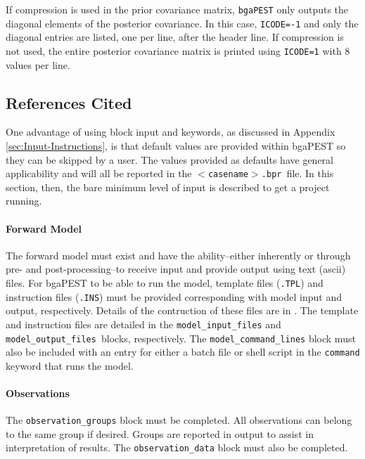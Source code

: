 \documentclass[11pt,oneside,onecolumn]{usgsreport}
\begin{document}
\begin{appendix}
\begin{bibunit}
If compression is used in the prior covariance matrix, \texttt{bgaPEST}
only outputs the diagonal elements of the posterior covariance. In
this case, \texttt{ICODE=-1} and only the diagonal entries are listed,
one per line, after the header line. If compression is not used, the
entire posterior covariance matrix is printed using \texttt{ICODE=1}
with 8 values per line.

\subsection{References Cited}
\putbib[GW]
\end{bibunit}
\begin{bibunit}

One advantage of using block input and keywords, as discussed in Appendix
\ref{sec:Input-Instructions}, is that default values are provided
within bgaPEST so they can be skipped by a user. The values provided
as defaults have general applicability and will all be reported in
the \texttt{$<$casename$>$.bpr }file. In this section, then, the bare
minimum level of input is described to get a project running. 


\paragraph*{Forward Model}

The forward model must exist and have the ability--either inherently
or through pre- and post-processing--to receive input and provide
output using text (ascii) files. For bgaPEST to be able to run the
model, template files (\texttt{.TPL}) and instruction files (\texttt{.INS})
must be provided corresponding with model input and output, respectively.
Details of the contruction of these files are in \citep[chapter 3]{PEST}.
The template and instruction files are detailed in the \texttt{model\_input\_files}
and \texttt{model\_output\_files }blocks, respectively. The \texttt{model\_command\_lines}
block must also be included with an entry for either a batch file
or shell script in the \texttt{command} keyword that runs the model.


\paragraph*{Observations}

The \texttt{observation\_groups} block must be completed. All observations
can belong to the same group if desired. Groups are reported in output
to assist in interpretation of results. The \texttt{observation\_data}
block must also be completed.



\end{bibunit}
\end{appendix}
\end{document}
